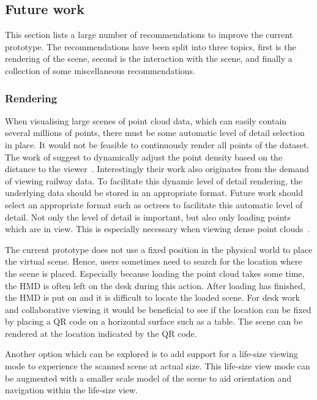 \subsection{Future work}
This section lists a large number of recommendations to improve the current prototype. The recommendations have been split into three topics, first is the rendering of the scene, second is the interaction with the scene, and finally a collection of some miscellaneous recommendations. 

\subsubsection{Rendering}\label{sec:immvis:render}
When visualising large scenes of point cloud data, which can easily contain several millions of points, there must be some automatic level of detail selection in place. It would not be feasible to continuously render all points of the dataset. The work of \citeauthor{Palha17} suggest to dynamically adjust the point density based on the distance to the viewer~\cite{Palha17}. Interestingly their work also originates from the demand of viewing railway data. To facilitate this dynamic level of detail rendering, the underlying data should be stored in an appropriate format. Future work should select an appropriate format such as octrees to facilitate this automatic level of detail. Not only the level of detail is important, but also only loading points which are in view. This is especially necessary when viewing dense point clouds~\cite{Vincke19}.

The current prototype does not use a fixed position in the physical world to place the virtual scene. Hence, users sometimes need to search for the location where the scene is placed. Especially because loading the point cloud takes some time, the HMD is often left on the desk during this action. After loading has finished, the HMD is put on and it is difficult to locate the loaded scene. For desk work and collaborative viewing it would be beneficial to see if the location can be fixed by placing a QR code on a horizontal surface such as a table. The scene can be rendered at the location indicated by the QR code. 

Another option which can be explored is to add support for a life-size viewing mode to experience the scanned scene at actual size. This life-size view mode can be augmented with a smaller scale model of the scene to aid orientation and navigation within the life-size view.


